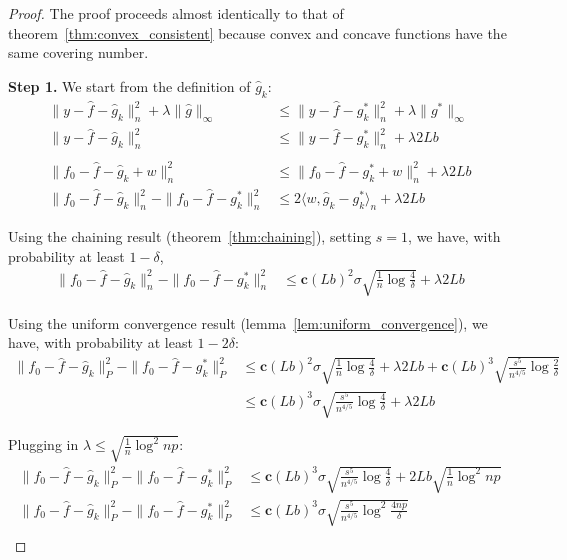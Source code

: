 \begin{proof}
The proof proceeds almost identically to that of theorem~\ref{thm:convex_consistent} because convex and concave functions have the same covering number.

\textbf{Step 1.} We start from the definition of $\hat{g}_k$:
\begin{align*}
\| y - \hat{f} - \hat{g}_k \|_n^2 + \lambda \| \hat{g} \|_\infty &\leq
   \| y - \hat{f} - g^*_k \|_n^2 + \lambda \| g^* \|_\infty \\
\| y - \hat{f} - \hat{g}_k \|_n^2 &\leq \| y - \hat{f} - g^*_k \|_n^2 + \lambda 2 Lb \\
 &\\
\| f_0 - \hat{f} - \hat{g}_k + w\|_n^2 & \leq \| f_0 - \hat{f} - g^*_k + w \|_n^2 
   +\lambda 2 Lb \\
\| f_0 - \hat{f} - \hat{g}_k \|_n^2 - \|f_0 -\hat{f} - g^*_k\|_n^2 &\leq
   2 \langle w, \hat{g}_k - g^*_k \rangle_n + \lambda 2Lb
\end{align*}

Using the chaining result (theorem~\ref{thm:chaining}), setting $s=1$, we have, with probability at least $1-\delta$,
\begin{align*}
\| f_0 - \hat{f} - \hat{g}_k \|_n^2 - \|f_0 - \hat{f} - g^*_k \|_n^2 &\leq
  \mathbf{c} (Lb)^2 \sigma \sqrt{ \frac{1}{n} \log \frac{4}{\delta} }+ \lambda 2 Lb
\end{align*}

Using the uniform convergence result (lemma~\ref{lem:uniform_convergence}), we have, with probability at least $1-2\delta$:
\begin{align*}
\| f_0 - \hat{f} - \hat{g}_k \|_P^2 - \|f_0 - \hat{f} - g^*_k \|_P^2 &\leq
  \mathbf{c} (Lb)^2 \sigma \sqrt{ \frac{1}{n} \log \frac{4}{\delta} }+ \lambda 2 Lb +
  \mathbf{c} (Lb)^3 \sqrt{\frac{s^5}{n^{4/5}} \log \frac{2}{\delta} } \\
 &\leq \mathbf{c}(Lb)^3\sigma \sqrt{\frac{s^5}{n^{4/5}} \log \frac{4}{\delta}}+ \lambda 2 Lb
\end{align*}

Plugging in $\lambda \leq \sqrt{ \frac{1}{n} \log^2 np}$:
\begin{align*}
\| f_0 - \hat{f} - \hat{g}_k \|_P^2 - \|f_0 - \hat{f} - g^*_k \|_P^2 &
\leq \mathbf{c}(Lb)^3\sigma \sqrt{\frac{s^5}{n^{4/5}} \log \frac{4}{\delta}}+ 
    2Lb \sqrt{\frac{1}{n} \log^2 np}\\
\| f_0 - \hat{f} - \hat{g}_k \|_P^2 - \|f_0 - \hat{f} - g^*_k \|_P^2 &
\leq \mathbf{c}(Lb)^3\sigma \sqrt{\frac{s^5}{n^{4/5}} \log^2 \frac{4np}{\delta}} \\
\end{align*}


\end{proof}
